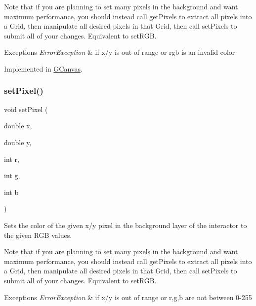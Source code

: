 Note that if you are planning to set many pixels in the background and want maximum performance, you should instead call get\+Pixels to extract all pixels into a Grid, then manipulate all desired pixels in that Grid, then call set\+Pixels to submit all of your changes. Equivalent to set\+R\+GB.


\begin{DoxyExceptions}{Exceptions}
{\em Error\+Exception} & if x/y is out of range or rgb is an invalid color \\
\hline
\end{DoxyExceptions}


Implemented in \mbox{\hyperlink{classGCanvas_a05b3441e912e4c0ed45e9ed43bb745d1}{G\+Canvas}}.

\mbox{\label{classGDrawingSurface_aec90e927c9da286214908d3f9da685d7}} 
\subsubsection{\texorpdfstring{set\+Pixel()}{setPixel()}\hspace{0.1cm}{\footnotesize\ttfamily [2/3]}}
{\footnotesize\ttfamily void set\+Pixel (\begin{DoxyParamCaption}\item[{double}]{x,  }\item[{double}]{y,  }\item[{int}]{r,  }\item[{int}]{g,  }\item[{int}]{b }\end{DoxyParamCaption})\hspace{0.3cm}{\ttfamily [virtual]}}



Sets the color of the given x/y pixel in the background layer of the interactor to the given R\+GB values. 

Note that if you are planning to set many pixels in the background and want maximum performance, you should instead call get\+Pixels to extract all pixels into a Grid, then manipulate all desired pixels in that Grid, then call set\+Pixels to submit all of your changes. Equivalent to set\+R\+GB.


\begin{DoxyExceptions}{Exceptions}
{\em Error\+Exception} & if x/y is out of range or r,g,b are not between 0-\/255 \\
\hline
\end{DoxyExceptions}


